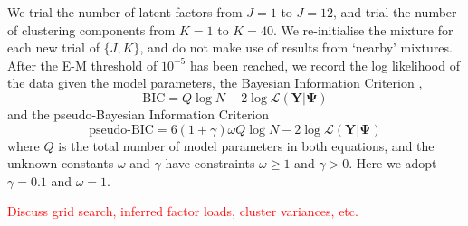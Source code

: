 \documentclass[twocolumn]{aastex61}
\newcommand{\todo}[1]{\textcolor{red}{#1}}
\newcommand{\vect}[1]{\boldsymbol{\mathbf{#1}}}
\renewcommand{\vec}[1]{\vect{#1}}
\newcommand{\data}{\textbf{Y}}
\begin{document}
We trial the number of latent factors from $J = 1$ to $J = 12$, and trial the
number of clustering components from $K = 1$ to $K = 40$. We re-initialise the
mixture for each new trial of $\{J, K\}$, and do not make use of results from
`nearby' mixtures. After the E-M threshold of $10^{-5}$ has been reached, we
record the log likelihood of the data given the model parameters, the
Bayesian Information Criterion \citep{bic}, 
\begin{equation}
	\textrm{BIC} = Q\log{N} - 2\log\mathcal{L}\left(\data|\vec\Psi\right) \label{eq:bic}
\end{equation} 
\noindent{}and the pseudo-Bayesian Information Criterion \citep{pseudo-bic}
\begin{equation}
 \textrm{pseudo-BIC} = 6(1 + \gamma)\omega{}Q\log{N} - 2\log\mathcal{L}\left(\data|\vec\Psi\right) \label{eq:pseudo-bic}
\end{equation}
\noindent{}where $Q$ is the total number of model parameters in both equations,
and the unknown constants $\omega$ and $\gamma$ have constraints
$\omega \geq 1$ and $\gamma > 0$. Here we adopt $\gamma = 0.1$ and $\omega = 1$.


\todo{Discuss grid search, inferred factor loads, cluster variances, etc.}
\end{document}
